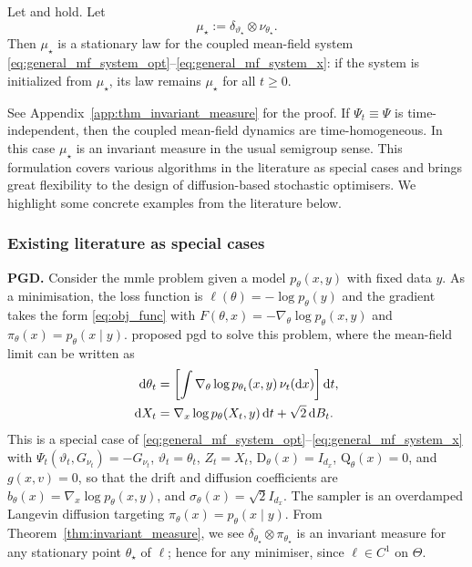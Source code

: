 \begin{theorem}\label{thm:invariant_measure} Let  and  hold. Let
\[
\mu_\star:=\delta_{\vartheta_\star}\otimes\nu_{\theta_\star}.
\]
Then \(\mu_\star\) is a stationary law for the coupled mean-field system \eqref{eq:general_mf_system_opt}--\eqref{eq:general_mf_system_x}: if the system is initialized from \(\mu_\star\), its law remains \(\mu_\star\) for all \(t\ge0\).
\end{theorem}
See Appendix~\ref{app:thm_invariant_measure} for the proof. If \(\Psi_t\equiv\Psi\) is time-independent, then the coupled mean-field dynamics are time-homogeneous. In this case \(\mu_\star\) is an invariant measure in the usual semigroup sense. This formulation covers various algorithms in the literature as special cases and brings great flexibility to the design of diffusion-based stochastic optimisers. We highlight some concrete examples from the literature below.

\subsubsection{Existing literature as special cases}

\textbf{PGD.} Consider the \gls*{mmle} problem given a model $p_\theta(x, y)$ with fixed data $y$. As a minimisation, the loss function is $\ell(\theta) = - \log p_\theta(y)$ and the gradient takes the form \eqref{eq:obj_func} with $F(\theta,x)=-\nabla_\theta \log p_\theta(x,y)$ and $\pi_\theta(x) = p_\theta(x \mid y)$. \citet{pmlr-v206-kuntz23a} proposed \gls*{pgd} to solve this problem, where the mean-field limit can be written as
\begin{align*}
\mathrm{d} \theta_t &=
\left[
\int \nabla_\theta \log p_{\theta_t}(x,y)\,
\nu_t(\mathrm{d} x)
\right] \mathrm{d} t,\\
    \mathrm{d} X_t
&=
\nabla_x\log p_\theta(X_t,y)\, \mathrm{d} t
+
\sqrt{2}\,\mathrm{d} B_t.
\end{align*}
This is a special case of \eqref{eq:general_mf_system_opt}--\eqref{eq:general_mf_system_x} with $\Psi_t(\vartheta_t,G_{\nu_t})=-G_{\nu_t}$, $\vartheta_t=\theta_t$, $Z_t=X_t$, $\mathrm{D}_\theta(x)=I_{d_x}$, $\mathrm{Q}_\theta(x)=0$, and $g(x,v)=0$, so that the drift and diffusion coefficients are $b_\theta(x)=\nabla_x\log p_\theta(x,y)$, and $\sigma_\theta(x)=\sqrt{2}I_{d_x}$. The sampler is an overdamped Langevin diffusion targeting $\pi_\theta(x)=p_\theta(x\mid y)$. From Theorem~\ref{thm:invariant_measure}, we see $\delta_{\theta_\star}\otimes\pi_{\theta_\star}$ is an invariant measure for any stationary point $\theta_\star$ of $\ell$; hence for any minimiser, since $\ell\in C^1$ on $\Theta$.

